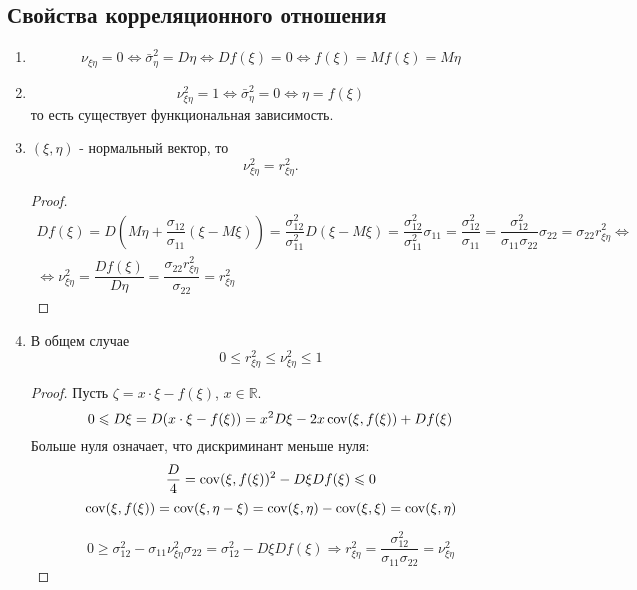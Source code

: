 \subsection{Свойства корреляционного отношения}
\begin{enumerate}
  \item 
    \[
      \nu_{\xi\eta} = 0 \Leftrightarrow \bar\sigma^2_\eta = D\eta \Leftrightarrow Df(\xi) = 0 \Leftrightarrow f(\xi) = Mf(\xi) = M\eta
    \]
  \item
    \[
    \nu_{\xi\eta}^2 = 1 \Leftrightarrow \bar\sigma_\eta^2 = 0 \Leftrightarrow \eta = f(\xi)
    \]
    то есть существует функциональная зависимость.

  \item $(\xi, \eta)$ - нормальный вектор, то 
    \[
      \nu_{\xi\eta}^2 = r_{\xi\eta}^2.
    \]
    \begin{proof}
      \begin{multline*}
        Df(\xi) = D\left(M\eta + \dfrac{\sigma_{12}}{\sigma_{11}} (\xi - M\xi)\right)
        = \dfrac{\sigma_{12}^2}{\sigma_{11}^2} D(\xi - M\xi)
        = \dfrac{\sigma_{12}^2}{\sigma_{11}^2} \sigma_{11}
        = \dfrac{\sigma_{12}^2}{\sigma_{11}}
        = \dfrac{\sigma_{12}^2}{\sigma_{11} \sigma_{22}} \sigma_{22}
        = \sigma_{22} r_{\xi\eta}^2
        \Leftrightarrow \\
        \Leftrightarrow
        \nu_{\xi\eta}^2 = \dfrac{Df(\xi)}{D\eta} = \dfrac{\sigma_{22} r_{\xi\eta}^2}{\sigma_{22}} = r_{\xi\eta}^2
      \end{multline*}
    \end{proof}

  \item В общем случае
    \[
      0 \leqslant r_{\xi\eta}^2 \leqslant \nu_{\xi\eta}^2 \leqslant 1
    \]
    \begin{proof}
      Пусть $\zeta = x \cdot \xi - f(\xi)$, $x\in\mathbb{R}$.
      \[
        0 \leqslant D\xi = D(x \cdot \xi - f(\xi)) = x^2 D\xi - 2 x \operatorname{cov} (\xi, f(\xi)) + D f(\xi)
      \]
      Больше нуля означает, что дискриминант меньше нуля:
      \[
        \dfrac{D}{4} = \operatorname{cov}(\xi, f(\xi))^2 - D\xi Df(\xi) \leqslant 0
      \]
      \[
        \operatorname{cov}(\xi, f(\xi)) = \operatorname{cov}(\xi, \eta - \xi)
        = \operatorname{cov}(\xi, \eta) - \operatorname{cov}(\xi, \xi) = \operatorname{cov}(\xi, \eta)
      \]

      \[
        0 \geqslant \sigma_{12}^2 - \sigma_{11} \nu_{\xi\eta}^2 \sigma_{22} = \sigma_{12}^2 - D\xi Df(\xi) \Rightarrow r_{\xi\eta}^2 = \dfrac{\sigma_{12}^2}{\sigma_{11} \sigma_{22}} = \nu_{\xi\eta}^2
      \]
    \end{proof}
\end{enumerate}

